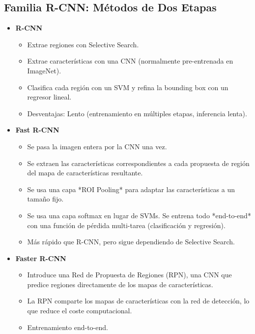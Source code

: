 \documentclass{article}
\begin{document}
\subsection{Familia R-CNN: Métodos de Dos Etapas}

\begin{itemize}
    \item \textbf{R-CNN}
    \begin{itemize}
        \item Extrae regiones con Selective Search.
        \item Extrae características con una CNN (normalmente pre-entrenada en ImageNet).
        \item Clasifica cada región con un SVM y refina la bounding box con un regresor lineal.
        \item Desventajas: Lento (entrenamiento en múltiples etapas, inferencia lenta).
    \end{itemize}
    \item \textbf{Fast R-CNN}
    \begin{itemize}
        \item Se pasa la imagen entera por la CNN una vez.
        \item Se extraen las características correspondientes a cada propuesta de región del mapa de características resultante.
    \item Se usa una capa *ROI Pooling* para adaptar las características a un tamaño fijo.
    \item Se usa una capa softmax en lugar de SVMs. Se entrena todo *end-to-end* con una función de pérdida multi-tarea (clasificación y regresión).
    \item Más rápido que R-CNN, pero sigue dependiendo de Selective Search.
  \end{itemize}
  \item \textbf{Faster R-CNN}
  \begin{itemize}
    \item Introduce una Red de Propuesta de Regiones (RPN), una CNN que predice regiones directamente de los mapas de características.
    \item La RPN comparte los mapas de características con la red de detección, lo que reduce el coste computacional.
    \item Entrenamiento end-to-end.
  \end{itemize}
\end{itemize}
\end{document}
